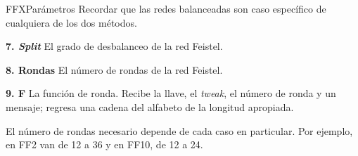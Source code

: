 \begin{frame}{FFX}{Parámetros}
{    Recordar que las redes balanceadas son caso específico de cualquiera de
    los dos métodos.
  }

  {
    \begin{block}{\textbf{7. \textit{Split}}}
      El grado de desbalanceo de la red Feistel.
    \end{block}

    \begin{block}{\textbf{8. Rondas}}
      El número de rondas de la red Feistel.
    \end{block}

    \begin{block}{\textbf{9. F}}
      La función de ronda. Recibe la llave, el \textit{tweak}, el número de
      ronda y un mensaje; regresa una cadena del alfabeto de la longitud
      apropiada.
    \end{block}
  }

  {
    El número de rondas necesario depende de cada caso en particular.
    Por ejemplo, en FF2 van de 12 a 36 y en FF10, de 12 a 24.
  }

\end{frame}
